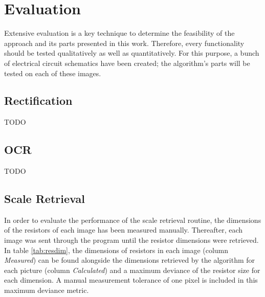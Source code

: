\documentclass[10pt,twocolumn,letterpaper]{article}
\begin{document}

\section{Evaluation}
\label{sec:eval}

Extensive evaluation is a key technique to determine the feasibility of the approach and its parts presented in this work. Therefore, every functionality should be tested qualitatively as well as quantitatively. For this purpose, a bunch of electrical circuit schematics have been created; the algorithm's parts will be tested on each of these images. 
\par

\subsection{Rectification}

TODO

\subsection{OCR}

TODO

\subsection{Scale Retrieval}

In order to evaluate the performance of the scale retrieval routine, the dimensions of the resistors of each image has been measured manually. Thereafter, each image was sent through the program until the resistor dimensions were retrieved. In table \ref{tab:resdim}, the dimensions of resistors in each image (column \textit{Measured}) can be found alongside the dimensions retrieved by the algorithm for each picture (column \textit{Calculated}) and a maximum deviance of the resistor size for each dimension. A manual measurement tolerance of one pixel is included in this maximum deviance metric.
\par
\end{document}

